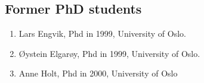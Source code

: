 \subsection*{Former PhD students}
\begin{enumerate}
\item Lars Engvik, Phd in 1999, University of Oslo. 
\item \O ystein Elgar\o y, Phd in 1999, University of Oslo.
\item Anne Holt, Phd in 2000, University of Oslo 
\end{enumerate}








